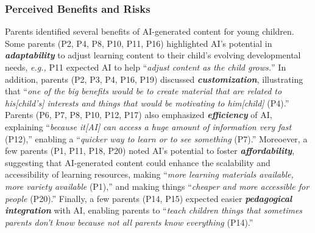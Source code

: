 \subsubsection{Perceived Benefits and Risks}
Parents identified several benefits of AI-generated content for young children. Some parents (P2, P4, P8, P10, P11, P16) highlighted AI's potential in \textit{\textbf{adaptability}} to adjust learning content to their child's evolving developmental needs, \textit{e.g.,} P11 expected AI to help ``\textit{adjust content as the child grows.}'' In addition, parents (P2, P3, P4, P16, P19) discussed \textit{\textbf{customization}}, illustrating that ``\textit{one of the big benefits would be to create material that are related to his[child's] interests and things that would be motivating to him[child]} (P4).'' Parents (P6, P7, P8, P10, P12, P17) also emphasized \textit{\textbf{efficiency}} of AI, explaining ``\textit{because it[AI] can access a huge amount of information very fast} (P12),'' enabling a ``\textit{quicker way to learn or to see something} (P7).'' Moreoever, a few parents (P1, P11, P18, P20) noted AI's potential to foster \textit{\textbf{affordability}}, suggesting that AI-generated content could enhance the scalability and accessibility of learning resources, making ``\textit{more learning materials available, more variety available} (P1),'' and making things ``\textit{cheaper and more accessible for people} (P20).'' Finally, a few parents (P14, P15) expected easier \textit{\textbf{pedagogical integration}} with AI, enabling parents to ``\textit{teach children things that sometimes parents don't know because not all parents know everything} (P14).''

